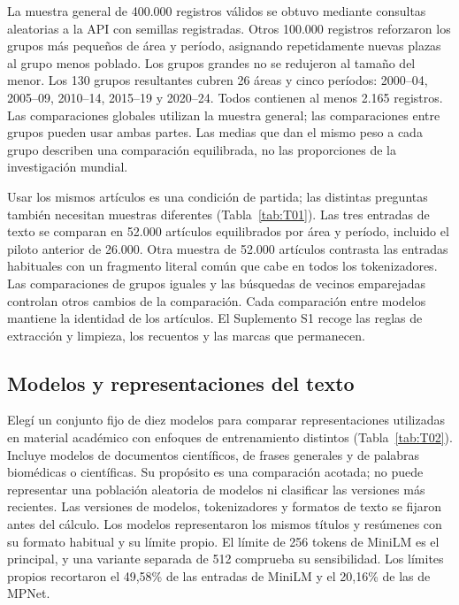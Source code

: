 \documentclass[12pt]{article}
\begin{document}
La muestra general de 400.000 registros válidos se obtuvo mediante consultas aleatorias a la API con semillas registradas. Otros 100.000 registros reforzaron los grupos más pequeños de área y período, asignando repetidamente nuevas plazas al grupo menos poblado. Los grupos grandes no se redujeron al tamaño del menor. Los 130 grupos resultantes cubren 26 áreas y cinco períodos: 2000--04, 2005--09, 2010--14, 2015--19 y 2020--24. Todos contienen al menos 2.165 registros. Las comparaciones globales utilizan la muestra general; las comparaciones entre grupos pueden usar ambas partes. Las medias que dan el mismo peso a cada grupo describen una comparación equilibrada, no las proporciones de la investigación mundial.

Usar los mismos artículos es una condición de partida; las distintas preguntas también necesitan muestras diferentes (Tabla~\ref{tab:T01}). Las tres entradas de texto se comparan en 52.000 artículos equilibrados por área y período, incluido el piloto anterior de 26.000. Otra muestra de 52.000 artículos contrasta las entradas habituales con un fragmento literal común que cabe en todos los tokenizadores. Las comparaciones de grupos iguales y las búsquedas de vecinos emparejadas controlan otros cambios de la comparación. Cada comparación entre modelos mantiene la identidad de los artículos. El Suplemento S1 recoge las reglas de extracción y limpieza, los recuentos y las marcas que permanecen.


\subsection{Modelos y representaciones del texto}
Elegí un conjunto fijo de diez modelos para comparar representaciones utilizadas en material académico con enfoques de entrenamiento distintos (Tabla~\ref{tab:T02}). Incluye modelos de documentos científicos, de frases generales y de palabras biomédicas o científicas. Su propósito es una comparación acotada; no puede representar una población aleatoria de modelos ni clasificar las versiones más recientes. Las versiones de modelos, tokenizadores y formatos de texto se fijaron antes del cálculo. Los modelos representaron los mismos títulos y resúmenes con su formato habitual y su límite propio. El límite de 256 tokens de MiniLM es el principal, y una variante separada de 512 comprueba su sensibilidad. Los límites propios recortaron el 49,58\% de las entradas de MiniLM y el 20,16\% de las de MPNet.
\end{document}
